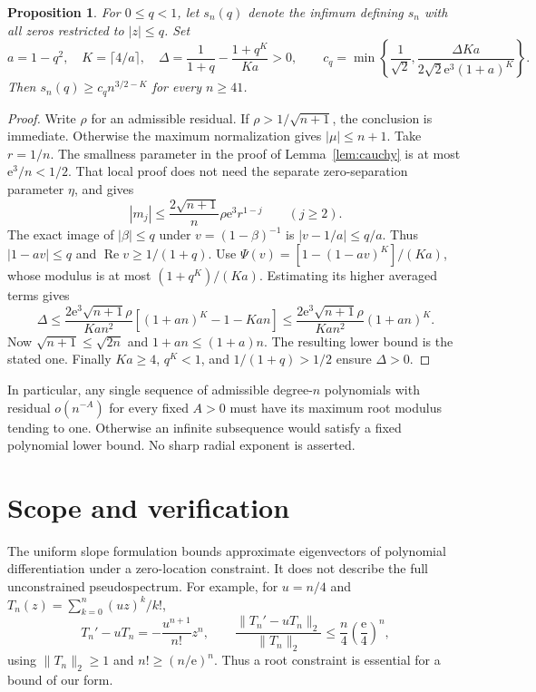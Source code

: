 \documentclass[11pt]{article}
\newtheorem{proposition}[theorem]{Proposition}
\theoremstyle{remark}\newtheorem{remark}[theorem]{Remark}
\newcommand{\norm}[1]{\lVert #1\rVert}
\newcommand{\Rea}{\operatorname{Re}}
\newcommand{\ee}{\mathrm e}
\begin{document}
\begin{proposition}\label{prop:radial}
For \(0\le q<1\), let \(s_n(q)\) denote the infimum defining \(s_n\)
with all zeros restricted to \(|z|\le q\). Set
\[
 a=1-q^2,\quad K=\lceil4/a\rceil,\quad
 \Delta=\frac1{1+q}-\frac{1+q^K}{Ka}>0,\qquad
 c_q=\min\left\{\frac1{\sqrt2},
       \frac{\Delta Ka}{2\sqrt2\ee^3(1+a)^K}\right\}.
\]
Then \(s_n(q)\ge c_q n^{3/2-K}\) for every \(n\ge41\).
\end{proposition}
\begin{proof}
Write \(\rho\) for an admissible residual. If
\(\rho>1/\sqrt{n+1}\), the conclusion is immediate.
Otherwise the maximum normalization gives \(|\mu|\le n+1\).
Take \(r=1/n\). The smallness parameter in the proof of
Lemma~\ref{lem:cauchy} is at most \(\ee^3/n<1/2\).
That local proof does not need the separate zero-separation
parameter \(\eta\), and gives
\[
 |m_j|\le\frac{2\sqrt{n+1}}n\rho\ee^3 r^{1-j}\qquad(j\ge2).
\]
The exact image of \(|\beta|\le q\) under \(v=(1-\beta)^{-1}\)
is \(|v-1/a|\le q/a\). Thus \(|1-av|\le q\) and
\(\Rea v\ge1/(1+q)\).
Use \(\Psi(v)=[1-(1-av)^K]/(Ka)\), whose modulus is at most
\((1+q^K)/(Ka)\). Estimating its higher averaged terms gives
\[
 \Delta\le\frac{2\ee^3\sqrt{n+1}\rho}{Kan^2}
       [(1+an)^K-1-Kan]
 \le\frac{2\ee^3\sqrt{n+1}\rho}{Kan^2}(1+an)^K.
\]
Now \(\sqrt{n+1}\le\sqrt{2n}\) and \(1+an\le(1+a)n\).
The resulting lower bound is the stated one. Finally \(Ka\ge4\),
\(q^K<1\), and \(1/(1+q)>1/2\) ensure \(\Delta>0\).
\end{proof}

In particular, any single sequence of admissible degree-\(n\)
polynomials with residual \(o(n^{-A})\) for every fixed \(A>0\)
must have its maximum root modulus tending to one. Otherwise an
infinite subsequence would satisfy a fixed polynomial lower bound.
No sharp radial exponent is asserted.

\section{Scope and verification}
The uniform slope formulation bounds approximate eigenvectors of
polynomial differentiation under a zero-location constraint.
It does not describe the full unconstrained pseudospectrum.
For example, for \(u=n/4\) and
\(T_n(z)=\sum_{k=0}^n(uz)^k/k!\),
\[
 T_n'-uT_n=-\frac{u^{n+1}}{n!}z^n,\qquad
 \frac{\norm{T_n'-uT_n}_2}{\norm{T_n}_2}
       \le\frac n4\left(\frac{\ee}{4}\right)^n,
\]
using \(\norm{T_n}_2\ge1\) and \(n!\ge(n/\ee)^n\).
Thus a root constraint is essential for a bound of our form.
\end{document}
